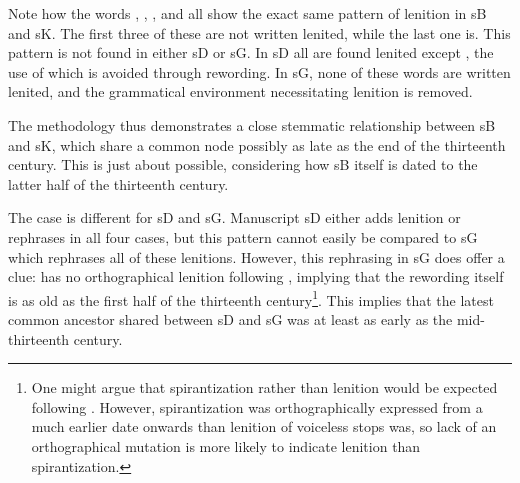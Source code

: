 Note how the words , , , and  all show the exact same pattern of lenition in \gls{sB} and \gls{sK}. The first three of these are not written lenited, while the last one is. This pattern is not found in either \gls{sD} or \gls{sG}. In \gls{sD} all are found lenited except , the use of which is avoided through rewording. In \gls{sG}, none of these words are written lenited, and the grammatical environment necessitating lenition is removed. 

The methodology thus demonstrates a close stemmatic relationship between \gls{sB} and \gls{sK}, which share a common node possibly as late as the end of the thirteenth century. This is just about possible, considering how \gls{sB} itself is dated to the latter half of the thirteenth century.

The case is different for \gls{sD} and \gls{sG}. Manuscript \gls{sD} either adds lenition or rephrases in all four cases, but this pattern cannot easily be compared to \gls{sG} which rephrases all of these lenitions. However, this rephrasing in \gls{sG} does offer a clue:  has no orthographical lenition following , implying that the rewording itself is as old as the first half of the thirteenth century\footnote{%
  One might argue that spirantization rather than lenition would be expected following . However, spirantization was orthographically expressed from a much earlier date onwards than lenition of voiceless stops was, so lack of an orthographical mutation is more likely to indicate lenition than spirantization.}.
This implies that the latest common ancestor shared between \gls{sD} and \gls{sG} was at least as early as the mid-thirteenth century.

